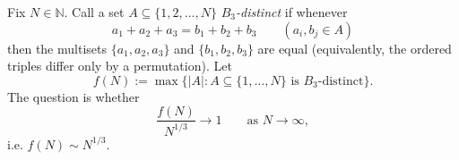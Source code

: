 Fix $N\in \mathbb{N}$. Call a set $A\subseteq\{1,2,\dots,N\}$ \emph{$B_3$-distinct} if whenever
\[
 a_1+a_2+a_3=b_1+b_2+b_3\qquad(a_i,b_j\in A)
\]
then the multisets $\{a_1,a_2,a_3\}$ and $\{b_1,b_2,b_3\}$ are equal (equivalently, the ordered triples differ only by a permutation).  Let
\[
 f(N):=\max\bigl\{|A|:A\subseteq\{1,\dots,N\}\text{ is $B_3$-distinct}\bigr\}.
\]
The question is whether
\[
 \frac{f(N)}{N^{1/3}}\to 1\qquad\text{as }N\to\infty,
\]
i.e. $f(N)\sim N^{1/3}$.
